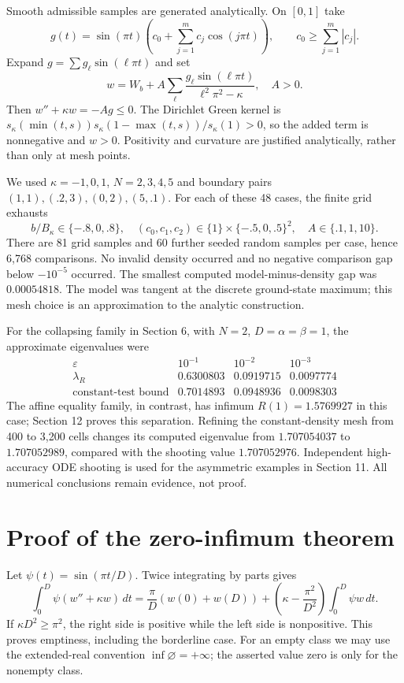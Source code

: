 \documentclass[12pt]{amsart}
\theoremstyle{definition}
\theoremstyle{remark}
\numberwithin{equation}{section}
\begin{document}
Smooth admissible samples are generated analytically. On $[0,1]$ take
\[
 g(t)=\sin(\pi t)\left(c_0+\sum_{j=1}^m c_j\cos(j\pi t)\right),
 \qquad c_0\ge\sum_{j=1}^m|c_j|.
\]
Expand $g=\sum g_\ell\sin(\ell\pi t)$ and set
\[
 w=W_b+A\sum_{\ell}\frac{g_\ell\sin(\ell\pi t)}{\ell^2\pi^2-\kappa},\quad A>0.
\]
Then $w''+\kappa w=-Ag\le0$. The Dirichlet Green kernel is
$s_\kappa(\min(t,s))s_\kappa(1-\max(t,s))/s_\kappa(1)>0$, so the added term is nonnegative and $w>0$. Positivity and curvature are justified analytically, rather than only at mesh points.

We used $\kappa=-1,0,1$, $N=2,3,4,5$ and boundary pairs
$(1,1),(.2,3),(0,2),(5,.1)$. For each of these 48 cases, the finite grid exhausts
\[
 b/B_\kappa\in\{-.8,0,.8\},\quad
 (c_0,c_1,c_2)\in\{1\}\times\{-.5,0,.5\}^2,\quad A\in\{.1,1,10\}.
\]
There are 81 grid samples and 60 further seeded random samples per case, hence 6,768 comparisons. No invalid density occurred and no negative comparison gap below $-10^{-5}$ occurred. The smallest computed model-minus-density gap was $0.00054818$. The model was tangent at the discrete ground-state maximum; this mesh choice is an approximation to the analytic construction.

For the collapsing family in Section 6, with $N=2$, $D=\alpha=\beta=1$, the approximate eigenvalues were
\[
\begin{array}{c|ccc}
 \varepsilon&10^{-1}&10^{-2}&10^{-3}\\\hline
 \lambda_R&0.6300803&0.0919715&0.0097774\\
 \text{constant-test bound}&0.7014893&0.0948936&0.0098303
\end{array}
\]
The affine equality family, in contrast, has infimum $R(1)=1.5769927$ in this case; Section 12 proves this separation. Refining the constant-density mesh from 400 to 3,200 cells changes its computed eigenvalue from $1.707054037$ to $1.707052989$, compared with the shooting value $1.707052976$. Independent high-accuracy ODE shooting is used for the asymmetric examples in Section 11. All numerical conclusions remain evidence, not proof.

\section{Proof of the zero-infimum theorem}
Let $\psi(t)=\sin(\pi t/D)$. Twice integrating by parts gives
\[
 \int_0^D\psi(w''+\kappa w)\,dt
 =\frac\pi D(w(0)+w(D))+
 \left(\kappa-\frac{\pi^2}{D^2}\right)\int_0^D\psi w\,dt.
\]
If $\kappa D^2\ge\pi^2$, the right side is positive while the left side is nonpositive. This proves emptiness, including the borderline case. For an empty class we may use the extended-real convention $\inf\varnothing=+\infty$; the asserted value zero is only for the nonempty class.
\end{document}
